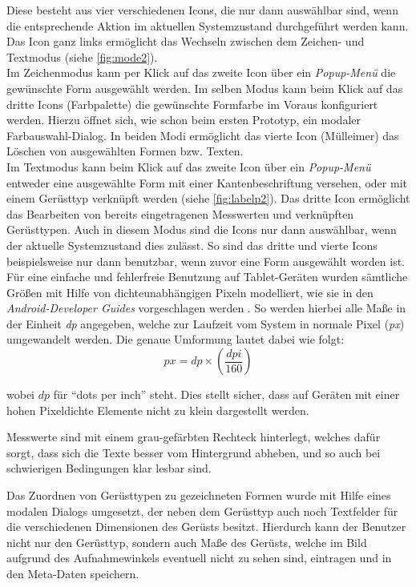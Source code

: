 \noindent
Diese besteht aus vier verschiedenen Icons, die nur dann auswählbar sind, wenn die entsprechende Aktion im aktuellen Systemzustand durchgeführt werden kann.
Das Icon ganz links ermöglicht das Wechseln zwischen dem Zeichen- und Textmodus (siehe \autoref{fig:mode2}). \\

Im Zeichenmodus kann per Klick auf das zweite Icon über ein \emph{Popup-Menü} die gewünschte Form ausgewählt werden. 
Im selben Modus kann beim Klick auf das dritte Icons (Farbpalette) die gewünschte Formfarbe im Voraus konfiguriert werden. Hierzu öffnet sich, wie schon beim ersten Prototyp, ein modaler Farbauswahl-Dialog.
In beiden Modi ermöglicht das vierte Icon (Mülleimer) das Löschen von ausgewählten Formen bzw. Texten. \\

Im Textmodus kann beim Klick auf das zweite Icon über ein \emph{Popup-Menü} entweder eine ausgewählte Form mit einer Kantenbeschriftung versehen, oder mit einem Gerüsttyp verknüpft werden (siehe \autoref{fig:labelp2}).
Das dritte Icon ermöglicht das Bearbeiten von bereits eingetragenen Messwerten und verknüpften Gerüsttypen.
Auch in diesem Modus sind die Icons nur dann auswählbar, wenn der aktuelle Systemzustand dies zulässt.
So sind das dritte und vierte Icons beispielsweise nur dann benutzbar, wenn zuvor eine Form ausgewählt worden ist. \\

Für eine einfache und fehlerfreie Benutzung auf Tablet-Geräten wurden sämtliche Größen mit Hilfe von dichteunabhängigen Pixeln modelliert, wie sie in den \emph{Android-Developer Guides} vorgeschlagen werden \citep{DP18}.
So werden hierbei alle Maße in der Einheit \emph{dp} angegeben, welche zur Laufzeit vom System in normale Pixel (\emph{px}) umgewandelt werden.
Die genaue Umformung lautet dabei wie folgt:
$$
px =  dp \times (\frac{dpi}{160})
$$

wobei $dp$ für ``dots per inch'' steht.
Dies stellt sicher, dass auf Geräten mit einer hohen Pixeldichte Elemente nicht zu klein dargestellt werden. \\

Messwerte sind mit einem grau-gefärbten Rechteck hinterlegt, welches dafür sorgt, dass sich die Texte besser vom Hintergrund abheben, und so auch bei schwierigen Bedingungen klar lesbar sind.  \\

Das Zuordnen von Gerüsttypen zu gezeichneten Formen wurde mit Hilfe eines modalen Dialogs umgesetzt, der neben dem Gerüsttyp auch noch Textfelder für die verschiedenen Dimensionen des Gerüsts besitzt.
Hierdurch kann der Benutzer nicht nur den Gerüsttyp, sondern auch Maße des Gerüsts, welche im Bild aufgrund des Aufnahmewinkels eventuell nicht zu sehen sind, eintragen und in den Meta-Daten speichern. \\

